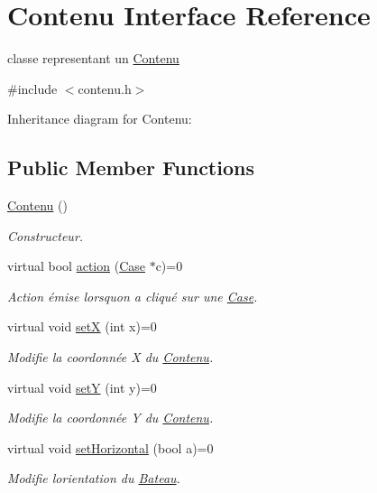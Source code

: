 \hypertarget{class_contenu}{}\section{Contenu Interface Reference}
\label{class_contenu}


classe representant un \hyperlink{class_contenu}{Contenu}  




{\ttfamily \#include $<$contenu.\+h$>$}



Inheritance diagram for Contenu\+:
\subsection*{Public Member Functions}
\begin{DoxyCompactItemize}
\item 
\hyperlink{class_contenu_ac20817eae49d031383e9a3be58c2bf15}{Contenu} ()
\begin{DoxyCompactList}\small\item\em Constructeur. \end{DoxyCompactList}\item 
virtual bool \hyperlink{class_contenu_ae54145207bfdae5a24ce2c8c523c74a0}{action} (\hyperlink{class_case}{Case} $\ast$c)=0
\begin{DoxyCompactList}\small\item\em Action émise lorsqu\textquotesingle{}on a cliqué sur une \hyperlink{class_case}{Case}. \end{DoxyCompactList}\item 
virtual void \hyperlink{class_contenu_a801fc9cb327750d2889ab3e7b185c029}{setX} (int x)=0
\begin{DoxyCompactList}\small\item\em Modifie la coordonnée X du \hyperlink{class_contenu}{Contenu}. \end{DoxyCompactList}\item 
virtual void \hyperlink{class_contenu_afc6fc6f669313fe77ca57559475d1750}{setY} (int y)=0
\begin{DoxyCompactList}\small\item\em Modifie la coordonnée Y du \hyperlink{class_contenu}{Contenu}. \end{DoxyCompactList}\item 
virtual void \hyperlink{class_contenu_ad06f3204769fdc758a5859fbb7cac637}{set\+Horizontal} (bool a)=0
\begin{DoxyCompactList}\small\item\em Modifie l\textquotesingle{}orientation du \hyperlink{class_bateau}{Bateau}. \end{DoxyCompactList}\item 

\end{DoxyCompactItemize}
